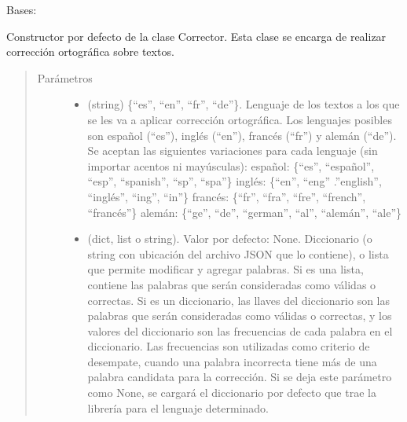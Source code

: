 \documentclass[letterpaper,10pt,openany,spanish]{sphinxmanual}
\begin{document}
\begin{fulllineitems}
\label{\detokenize{funciones/correccion:correccion.Corrector}}
Bases: 

Constructor por defecto de la clase Corrector. Esta clase se encarga         de realizar corrección ortográfica sobre textos.
\begin{quote}\begin{description}
\item[{Parámetros}] \leavevmode\begin{itemize}
\item {} 
 \textendash{} (string) \{“es”, “en”, “fr”, “de”\}. Lenguaje de los             textos a los que se les va a aplicar corrección ortográfica. Los lenguajes posibles son español             (“es”), inglés (“en”), francés (“fr”) y alemán (“de”). Se aceptan las             siguientes variaciones para cada lenguaje (sin importar acentos ni mayúsculas):                      español: \{“es”, “español”, “esp”, “spanish”, “sp”, “spa”\} 
 inglés: \{“en”, “eng” .”english”, “inglés”, “ing”, “in”\} 
 francés: \{“fr”, “fra”, “fre”, “french”, “francés”\} 
 alemán: \{“ge”, “de”, “german”, “al”, “alemán”, “ale”\}   

\item {} 
 \textendash{} (dict, list o string). Valor por defecto: None. Diccionario (o string con ubicación del             archivo JSON que lo contiene), o lista que permite modificar y agregar palabras.             Si es una lista, contiene las palabras que serán consideradas como válidas o correctas.             Si es un diccionario, las llaves del diccionario son las palabras que serán consideradas
como válidas o correctas, y los valores del diccionario son las frecuencias de cada palabra             en el diccionario. Las frecuencias son utilizadas como criterio de desempate, cuando una             palabra incorrecta tiene más de una palabra candidata para la corrección. Si se deja este             parámetro como None, se cargará el diccionario por defecto que trae la librería              para el lenguaje determinado.


\end{itemize}
\end{description}
\end{quote}
\end{fulllineitems}
\end{document}
